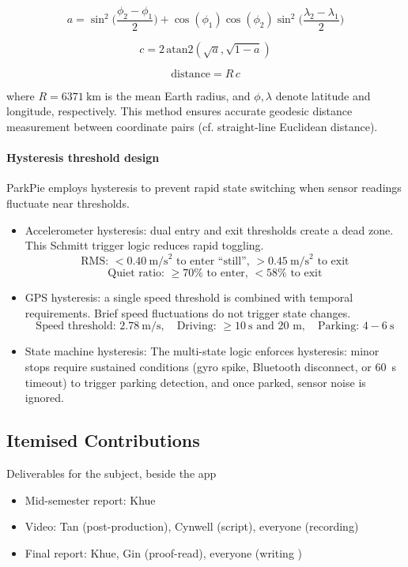 \[
a = \sin^2\Big(\frac{\phi_2 - \phi_1}{2}\Big) + \cos(\phi_1)\cos(\phi_2)\sin^2\Big(\frac{\lambda_2 - \lambda_1}{2}\Big)
\]

\[
c = 2 \, \text{atan2}(\sqrt{a}, \sqrt{1-a})
\]

\[
\text{distance} = R \, c
\]

where $R = 6371~\text{km}$ is the mean Earth radius, and $\phi, \lambda$ denote latitude and longitude, respectively. This method ensures accurate geodesic distance measurement between coordinate pairs (cf. straight-line Euclidean distance).

\paragraph{Hysteresis threshold design}

ParkPie employs hysteresis to prevent rapid state switching when sensor readings fluctuate near thresholds.

\begin{itemize}
    \item Accelerometer hysteresis: dual entry and exit thresholds create a dead zone. This Schmitt trigger logic reduces rapid toggling.
        \[
        \text{RMS: } < 0.40~\text{m/s}^2 \text{ to enter ``still'', } > 0.45~\text{m/s}^2 \text{ to exit}
        \]
        \[
        \text{Quiet ratio: } \ge 70\% \text{ to enter, } < 58\% \text{ to exit}
        \]
    \item GPS hysteresis: a single speed threshold is combined with temporal requirements. Brief speed fluctuations do not trigger state changes.
        \[
        \text{Speed threshold: } 2.78~\text{m/s}, \quad
        \text{Driving: } \ge 10~\text{s and 20~m}, \quad
        \text{Parking: } 4-6~\text{s}
        \]
    \item State machine hysteresis: The multi-state logic enforces hysteresis: minor stops require sustained conditions (gyro spike, Bluetooth disconnect, or 60~s timeout) to trigger parking detection, and once parked, sensor noise is ignored.
\end{itemize}

\subsection{Itemised Contributions}

Deliverables for the subject, beside the app

\begin{itemize}
    \item Mid-semester report: Khue
    \item Video: Tan (post-production), Cynwell (script), everyone (recording)
    \item Final report: Khue, Gin (proof-read), everyone (writing )
\end{itemize}

